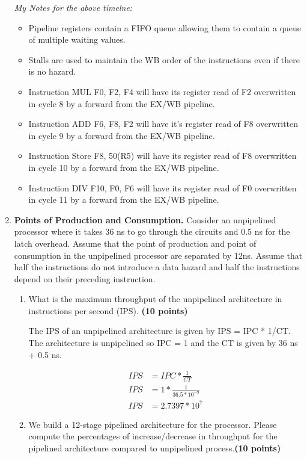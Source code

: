 \documentclass[a4paper, 11pt]{exam}
\begin{document}
\begin{enumerate}
\textit{My Notes for the above timelne:}
%
\begin{itemize}
	\item Pipeline registers contain a FIFO queue allowing them to contain a queue of multiple waiting values.
	\item Stalls are used to maintain the WB order of the instructions even if there is no hazard.
	\item Instruction MUL F0, F2, F4 will have its register read of F2 overwritten in cycle 8 by a forward from the EX/WB pipeline. 
	\item Instruction ADD F6, F8, F2 will have it's register read of F8 overwritten in cycle 9 by a forward from the EX/WB pipeline.
	\item Instruction Store F8, 50(R5) will have its register read of F8 overwritten in cycle 10 by a forward from the EX/WB pipeline.
	\item Instruction DIV F10, F0, F6 will have its register read of F0 overwritten in cycle 11 by a forward from the EX/WB pipeline.
\end{itemize}

\item \textbf{Points of Production and Consumption.}
Consider an unpipelined processor where it takes 36 ns to go through the circuits and 0.5 ns for the latch overhead. Assume that the point of production and point of consumption in the unpipelined processor are separated by 12ns. Assume that half the instructions do not introduce a data hazard and half the instructions depend on their preceding instruction.

\begin{enumerate}
\item What is the maximum throughput of the unpipelined architecture in instructions per second (IPS). \textbf{(10 points)} \\

\hfill
 
The IPS of an unpipelined architecture is given by IPS = IPC * 1/CT. The architecture is unpipelined so IPC = 1 and the CT is given by 36 ns + 0.5 ns.

\begin{align*} 
	IPS &= IPC * \frac{1}{CT} \\
	IPS &= 1 * \frac{1}{36.5 * 10^{-9}}\\
	IPS &= 2.7397 * 10^7
\end{align*}

\item We build a 12-stage pipelined architecture for the processor. Please compute the percentages of increase/decrease in throughput for the pipelined architecture compared to unpipelined process.\textbf {(10 points)}


\end{enumerate}
\end{enumerate}
\end{document}
